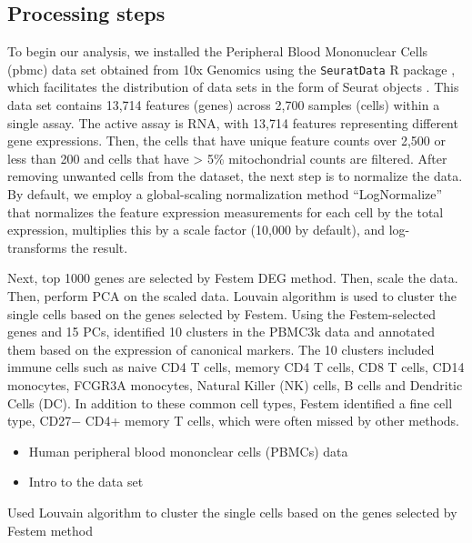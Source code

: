 \documentclass[
  12pt]{article}
\begin{document}
\hypertarget{processing-steps}{%
\subsection{Processing steps}\label{processing-steps}}

To begin our analysis, we installed the Peripheral Blood Mononuclear
Cells (pbmc) data set obtained from 10x Genomics using the
\texttt{SeuratData} R package \citep{Rahul2019}, which facilitates the
distribution of data sets in the form of Seurat objects
\citep{Yuhan2021}. This data set contains 13,714 features (genes) across
2,700 samples (cells) within a single assay. The active assay is RNA,
with 13,714 features representing different gene expressions. Then, the
cells that have unique feature counts over 2,500 or less than 200 and
cells that have \textgreater{} 5\% mitochondrial counts are filtered.
After removing unwanted cells from the dataset, the next step is to
normalize the data. By default, we employ a global-scaling normalization
method ``LogNormalize'' that normalizes the feature expression
measurements for each cell by the total expression, multiplies this by a
scale factor (10,000 by default), and log-transforms the result.

Next, top 1000 genes are selected by Festem \citep{Chen2023} DEG method.
Then, scale the data. Then, perform PCA on the scaled data. Louvain
algorithm is used to cluster the single cells based on the genes
selected by Festem. Using the Festem-selected genes and 15 PCs,
identified 10 clusters in the PBMC3k data and annotated them based on
the expression of canonical markers. The 10 clusters included immune
cells such as naive CD4 T cells, memory CD4 T cells, CD8 T cells, CD14
monocytes, FCGR3A monocytes, Natural Killer (NK) cells, B cells and
Dendritic Cells (DC). In addition to these common cell types, Festem
identified a fine cell type, CD27− CD4+ memory T cells, which were often
missed by other methods.

\begin{itemize}
\item
  Human peripheral blood mononclear cells (PBMCs) data
\item
  Intro to the data set
\end{itemize}

Used Louvain algorithm to cluster the single cells based on the genes
selected by Festem method
\end{document}
